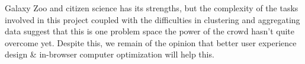 \documentclass[../main.tex]{subfiles}
\begin{document}
Galaxy Zoo and citizen science has its strengths, but the complexity of the tasks involved in this project coupled with the difficulties in clustering and aggregating data suggest that this is one problem space the power of the crowd hasn't quite overcome yet. Despite this, we remain of the opinion that better user experience design \& in-browser computer optimization will help this.
\end{document}
